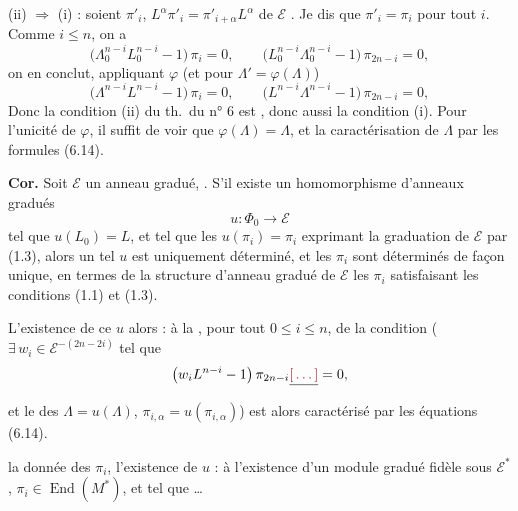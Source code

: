 \documentclass[11pt,a4paper]{article}
\begin{document}

(ii) $\Rightarrow$ (i) : soient \ill{} $\pi'_{i}$, \ill{}
$L^{\alpha} \pi'_{i} = \pi'_{i+\alpha} L^{\alpha}$ \ill{} de $\mathcal{E}$
\ill{}. Je dis que $\pi'_{i} = \pi_{i}$ pour tout $i$. Comme $i \leqslant n$, on a
\[ \bigl( \Lambda_{0}^{n-i} L_{0}^{n-i} - 1 \bigr)\, \pi_{i} = 0 , \qquad \bigl( L_{0}^{n-i} \Lambda_{0}^{n-i} - 1 \bigr)\, \pi_{2n-i} = 0 , \]
on en conclut, appliquant $\varphi$ (et pour $\Lambda' = \varphi(\Lambda)$)
\[ \bigl( \Lambda^{n-i} L^{n-i} - 1 \bigr)\, \pi_{i} = 0 , \qquad \bigl( L^{n-i} \Lambda^{n-i} - 1 \bigr)\, \pi_{2n-i} = 0 , \]
Donc la condition (ii) du th.\ du n° 6 est , donc aussi la
condition (i). \struck{\ill{}} Pour l'unicité de $\varphi$, il suffit de
voir que $\varphi(\Lambda) = \Lambda$, et
 
 \struck{\ill{}}
\ill{} la caractérisation  de $\Lambda$  par les formules (6.14).


\textbf{Cor.} Soit $\mathcal{E}$ un anneau gradué, . \add{\ill{}} S'il existe un homomorphisme d'anneaux gradués
\[ u \colon \Phi_{0} \longrightarrow \mathcal{E} \]
tel que $u(L_{0}) = L$, et tel que les $u(\pi_{i}) = \pi_{i}$ exprimant la
graduation de $\mathcal{E}$ par (1.3), alors un tel $u$ est
uniquement déterminé, et les $\pi_{i}$ sont déterminés de façon unique, en termes de la
structure d'anneau gradué de $\mathcal{E}$ \ill{} les $\pi_{i}$ satisfaisant
les conditions (1.1) et (1.3).

L'existence de ce $u$  alors :  à la
, pour tout $0 \leqslant i \leqslant n$, de la condition
($\exists\, w_{i} \in \mathcal{E}^{-(2n-2i)}$ tel que
\[ \bigl( w_{i} L^{n-i} - 1 \bigr)\, \pi_{2n-i} \struck{\ill{}} = 0 , \]
et \struck{\ill{}} le  des $\Lambda = u(\Lambda)$,  $\pi_{i,\alpha} = u(\pi_{i,\alpha})$)
est alors caractérisé 
par les équations (6.14).

 \struck{\ill{}}
\ill{} la donnée des $\pi_{i}$, l'existence de $u$  : à
l'existence d'un module gradué fidèle sous $\mathcal{E}^{*}$, 
\ill{} $\pi_{i} \in \operatorname{End}(M^{*})$, et tel que \ldots
\end{document}
